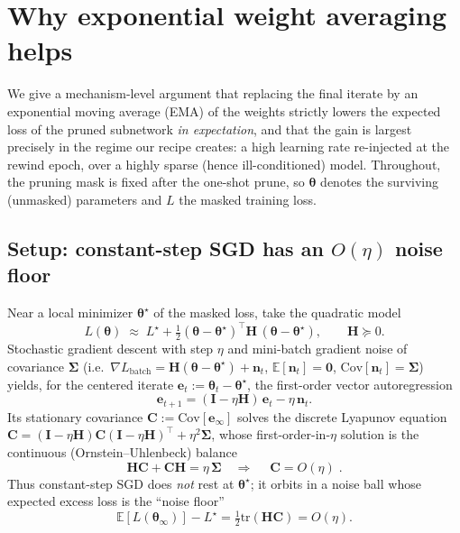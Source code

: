 \documentclass[11pt]{article}
\theoremstyle{remark}
\newcommand{\E}{\mathbb{E}}
\newcommand{\Cov}{\mathrm{Cov}}
\newcommand{\tr}{\mathrm{tr}}
\newcommand{\Hess}{\bm{H}}
\newcommand{\Sig}{\bm{\Sigma}}
\begin{document}
\section{Why exponential weight averaging helps}
\label{sec:ema}

We give a mechanism-level argument that replacing the final iterate by an
exponential moving average (EMA) of the weights strictly lowers the expected
loss of the pruned subnetwork \emph{in expectation}, and that the gain is
largest precisely in the regime our recipe creates: a high learning rate
re-injected at the rewind epoch, over a highly sparse (hence ill-conditioned)
model. Throughout, the pruning mask is fixed after the one-shot prune, so
$\bm\theta$ denotes the surviving (unmasked) parameters and $L$ the masked
training loss.

\subsection{Setup: constant-step SGD has an $O(\eta)$ noise floor}

Near a local minimizer $\bm\theta^\star$ of the masked loss, take the quadratic
model
\begin{equation}
L(\bm\theta)\;\approx\;L^\star+\tfrac12(\bm\theta-\bm\theta^\star)^\top
\Hess\,(\bm\theta-\bm\theta^\star),\qquad \Hess\succeq 0 .
\end{equation}
Stochastic gradient descent with step $\eta$ and mini-batch gradient noise of
covariance $\Sig$ (i.e.\ $\nabla L_{\mathrm{batch}}=\Hess(\bm\theta-\bm\theta^\star)+\bm n_t$,
$\E[\bm n_t]=\bm 0$, $\Cov[\bm n_t]=\Sig$) yields, for the centered iterate
$\bm e_t:=\bm\theta_t-\bm\theta^\star$, the first-order vector autoregression
\begin{equation}
\bm e_{t+1}=(\bm I-\eta\Hess)\,\bm e_t-\eta\,\bm n_t .
\label{eq:var1}
\end{equation}
Its stationary covariance $\bm C:=\Cov[\bm e_\infty]$ solves the discrete
Lyapunov equation $\bm C=(\bm I-\eta\Hess)\bm C(\bm I-\eta\Hess)^\top+\eta^2\Sig$,
whose first-order-in-$\eta$ solution is the continuous (Ornstein--Uhlenbeck)
balance
\begin{equation}
\Hess\bm C+\bm C\Hess=\eta\,\Sig
\quad\Longrightarrow\quad
\boxed{\;\bm C=O(\eta)\;}.
\label{eq:noise-floor}
\end{equation}
Thus constant-step SGD does \emph{not} rest at $\bm\theta^\star$; it orbits in a
noise ball whose expected excess loss is the ``noise floor''
\begin{equation}
\E[L(\bm\theta_\infty)]-L^\star=\tfrac12\tr(\Hess\bm C)=O(\eta).
\label{eq:gap-raw}
\end{equation}
\end{document}
